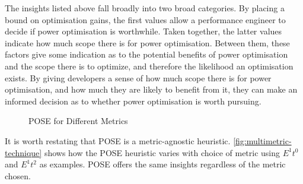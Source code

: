 The insights listed above fall broadly into two broad categories.
By placing a bound on optimisation gains, the first values allow a performance engineer to decide if power optimisation is worthwhile.
Taken together, the latter values indicate how much scope there is for power optimisation.
Between them, these factors give some indication as to the potential benefits of power optimisation and the scope there is to optimize, and therefore the likelihood an optimisation exists.
By giving developers a sense of how much scope there is for power optimisation, and how much they are likely to benefit from it, they can make an informed decision as to whether power optimisation is worth pursuing.

\begin{figure}
\centering

\caption{POSE for Different Metrics}
\label{fig:multimetric-technique}
\end{figure}

It is worth restating that POSE is a metric-agnostic heuristic. \autoref{fig:multimetric-technique} shows how the POSE heuristic varies with choice of metric using $E^1t^0$ and $E^1t^2$ as examples. POSE offers the same insights regardless of the metric chosen.


